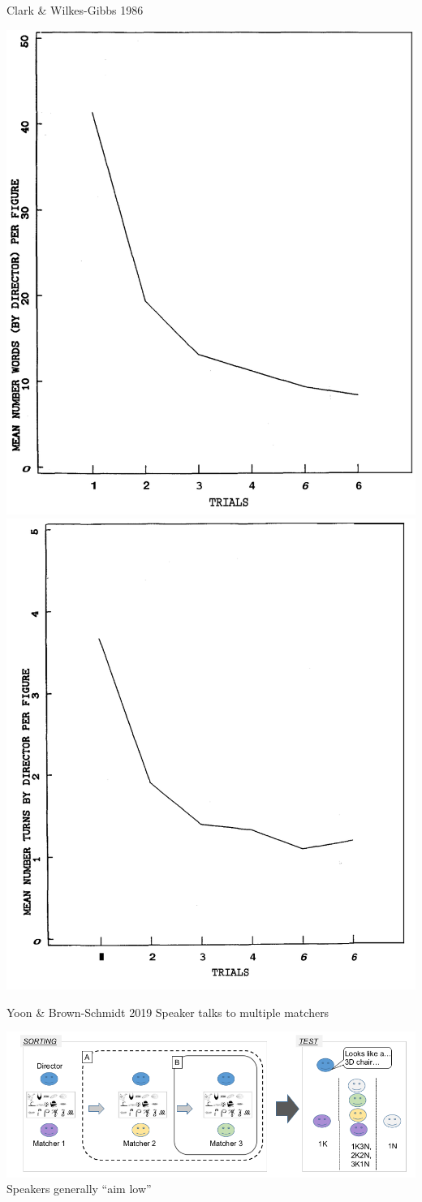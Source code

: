 \documentclass[12pt, xcolor=beamer,table,usenames,dvipsnames, ignorenonframetext, ngerman,t]{beamer}
\begin{document}
\begin{frame}{Clark \& Wilkes-Gibbs 1986}
	
	\includegraphics[width=.48\textwidth]{images/clark_words.png}
		\includegraphics[width=.5\textwidth]{images/clark_turns.png}
\end{frame}
\begin{frame}{Yoon \& Brown-Schmidt 2019}
	Speaker talks to multiple matchers
	
			\includegraphics[width=\textwidth]{images/yoon_diagram.png}
			Speakers generally ``aim low'' 
\end{frame}
%
\end{document}
